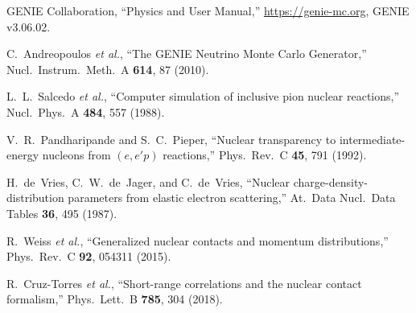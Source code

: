 \documentclass[11pt,a4paper]{article}
\begin{document}
\begin{enumerate}[label={[\arabic*]}]
  \item GENIE Collaboration, ``Physics and User Manual,''
        \url{https://genie-mc.org}, GENIE v3.06.02.
  \item C.~Andreopoulos \textit{et al.},
        ``The GENIE Neutrino Monte Carlo Generator,''
        Nucl.\ Instrum.\ Meth.\ A \textbf{614}, 87 (2010).
  \item L.~L.~Salcedo \textit{et al.},
        ``Computer simulation of inclusive pion nuclear reactions,''
        Nucl.\ Phys.\ A \textbf{484}, 557 (1988).
  \item V.~R.~Pandharipande and S.~C.~Pieper,
        ``Nuclear transparency to intermediate-energy nucleons from
        $(e,e'p)$ reactions,''
        Phys.\ Rev.\ C \textbf{45}, 791 (1992).
  \item H.~de~Vries, C.~W.~de~Jager, and C.~de~Vries,
        ``Nuclear charge-density-distribution parameters from elastic
        electron scattering,''
        At.\ Data Nucl.\ Data Tables \textbf{36}, 495 (1987).
  \item R.~Weiss \textit{et al.},
        ``Generalized nuclear contacts and momentum distributions,''
        Phys.\ Rev.\ C \textbf{92}, 054311 (2015).
  \item R.~Cruz-Torres \textit{et al.},
        ``Short-range correlations and the nuclear contact formalism,''
        Phys.\ Lett.\ B \textbf{785}, 304 (2018).
\end{enumerate}
\end{document}
